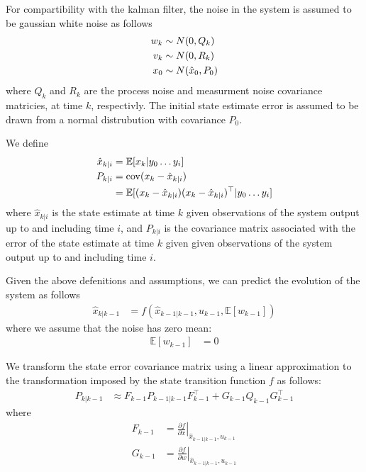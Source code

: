 \documentclass[]{article}
\begin{document}
{For compartibility with the kalman filter, the noise in the system is assumed to be gaussian white noise as follows
\begin{align}
	w_k &\sim N(0,Q_k) \notag \\
	v_k &\sim N(0,R_k) \notag \\
	x_0 &\sim N(\hat{x}_0,P_0)
	\label{eqn:noisedef}
\end{align}
where $Q_k$ and $R_k$ are the process noise and measurment noise covariance matricies, at time $k$, respectivly. The initial state estimate error is assumed to be drawn from a normal distrubution with covariance $P_0$.

We define
\begin{align}
	\hat{x}_{k|i} 	&= \mathbb{E}[x_k|y_0 \hdots y_i] \\
	P_{k|i} 		&= \operatorname{cov}(x_k - \hat{x}_{k|i}) \notag \\
					&= \mathbb{E}[ (x_k-\hat{x}_{k|i}) (x_k-\hat{x}_{k|i})^\top | y_0 \hdots y_i]
\end{align}
where $\hat{x}_{k|i}$ is the state estimate at time $k$ given observations of the system output up to and including time $i$, and $P_{k|i}$ is the covariance matrix associated with the error of the state estimate at time $k$ given given observations of the system output up to and including time $i$.

Given the above defenitions and assumptions, we can predict the evolution of the system as follows
\begin{align}
	\hat{x}_{k|k-1} &= f(\hat{x}_{k-1|k-1}, u_{k-1}, \mathbb{E}[w_{k-1}])
	\label{eqn:predictx}
\end{align}
where we assume that the noise has zero mean:
\begin{align}
	\mathbb{E}[w_{k-1}] &= 0
\end{align}

We transform the state error covariance matrix using a linear approximation to the transformation imposed by the state transition function $f$ as follows:
\begin{align}
	P_{k|k-1} &\approx F_{k-1} P_{k-1|k-1} F_{k-1}^\top + G_{k-1} Q_{k-1} G_{k-1}^\top
	\label{eqn:predictP}
\end{align}
where
\begin{align}
	F_{k-1} &= \left . \frac{\partial f}{\partial x} \right \vert _{\hat{x}_{k-1|k-1},u_{k-1}} \\
	G_{k-1} &= \left . \frac{\partial f}{\partial w} \right \vert _{\hat{x}_{k-1|k-1},u_{k-1}}
\end{align}

}
\end{document}
